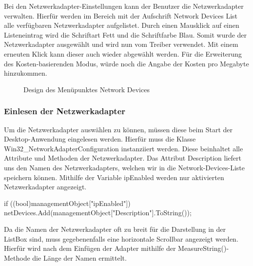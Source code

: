 Bei den Netzwerkadapter-Einstellungen kann der Benutzer die Netzwerkadapter verwalten. Hierfür werden im Bereich mit der Aufschrift \grqq Network Devices List\grqq{} alle verfügbaren Netzwerkadapter aufgelistet. Durch einen Mausklick auf einen Listeneintrag wird die Schriftart Fett und die Schriftfarbe Blau. Somit wurde der Netzwerkadapter ausgewählt und wird nun vom Treiber verwendet. Mit einem erneuten Klick kann dieser auch wieder abgewählt werden. Für die Erweiterung des Kosten-basierenden Modus, würde noch die Angabe der Kosten pro Megabyte hinzukommen.
\\
\begin{figure}[H]
    \centering
    \setlength{\fboxsep}{1pt}
	\setlength{\fboxrule}{1pt}
    \caption{Design des Menüpunktes Network Devices} 
\end{figure}

\subsubsection{Einlesen der Netzwerkadapter}

Um die Netzwerkadapter auswählen zu können, müssen diese beim Start der Desktop-Anwendung eingelesen werden. Hierfür muss die Klasse Win32\_NetworkAdapterConfiguration instanziiert werden. Diese beinhaltet alle Attribute und Methoden der Netzwerkadapter. Das Attribut Description liefert uns den Namen des Netzwerkadapters, welchen wir in die Network-Devices-Liste speichern können. Mithilfe der Variable ipEnabled werden nur aktivierten Netzwerkadapter angezeigt.

\begin{program}[H]
\begin{CSharpCode}
if ((bool)managementObject["ipEnabled"])
{
    netDevices.Add(managementObject["Description"].ToString());
}
\end{CSharpCode}
\caption{Einlesen der Namen der aktiven Netzwerkadapter}
\end{program}
\noindent
Da die Namen der Netzwerkadapter oft zu breit für die Darstellung in der ListBox sind, muss gegebenenfalls eine horizontale Scrollbar angezeigt werden. Hierfür wird nach dem Einfügen der Adapter mithilfe der MeasureString()-Methode die Länge der Namen ermittelt.

\lstset{basicstyle=\footnotesize}

\pagebreak

